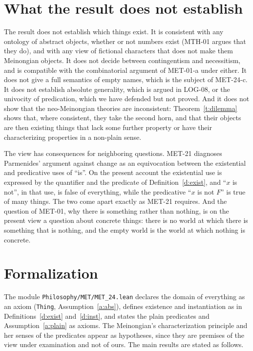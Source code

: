 \documentclass{situationist-preprint}
\begin{document}
\section{What the result does not establish}\label{s:not}

The result does not establish which things exist. It is consistent with any ontology of abstract objects, whether or not numbers exist (MTH-01 argues that they do), and with any view of fictional characters that does not make them Meinongian objects. It does not decide between contingentism and necessitism, and is compatible with the combinatorial argument of MET-01-a under either. It does not give a full semantics of empty names, which is the subject of MET-24-c. It does not establish absolute generality, which is argued in LOG-08, or the univocity of predication, which we have defended but not proved. And it does not show that the neo-Meinongian theories are inconsistent: Theorem~\ref{t:dilemma} shows that, where consistent, they take the second horn, and that their objects are then existing things that lack some further property or have their characterizing properties in a non-plain sense.

The view has consequences for neighboring questions. MET-21 diagnoses Parmenides' argument against change as an equivocation between the existential and predicative uses of \enquote{is}. On the present account the existential use is expressed by the quantifier and the predicate of Definition~\ref{d:exist}, and \enquote{$x$ is not}, in that use, is false of everything, while the predicative \enquote{$x$ is not $F$} is true of many things. The two come apart exactly as MET-21 requires. And the question of MET-01, why there is something rather than nothing, is on the present view a question about concrete things: there is no world at which there is something that is nothing, and the empty world is the world at which nothing is concrete.

\section{Formalization}\label{s:lean}

The module \nolinkurl{Philosophy/MET/MET_24.lean} declares the domain of everything as an axiom (\texttt{Thing}, Assumption~\ref{a:abs}), defines existence and instantiation as in Definitions~\ref{d:exist} and~\ref{d:inst}, and states the plain predicates and Assumption~\ref{a:plain} as axioms. The Meinongian's characterization principle and her senses of the predicates appear as hypotheses, since they are premises of the view under examination and not of ours. The main results are stated as follows.
\end{document}
